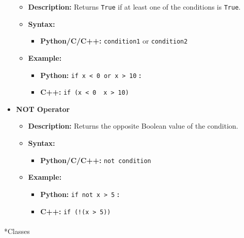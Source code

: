 \documentclass[
  letterpaper,
  DIV=11,
  numbers=noendperiod]{scrreprt}
\makeatletter
\let\oldparagraph\paragraph
\renewcommand{\paragraph}{
    \@ifstar
      \xxxParagraphStar
      \xxxParagraphNoStar
  }
\newcommand{\xxxParagraphStar}[1]{\oldparagraph*{#1}\mbox{}}
\newcommand{\xxxParagraphNoStar}[1]{\oldparagraph{#1}\mbox{}}
\providecommand{\tightlist}{%
  \setlength{\itemsep}{0pt}\setlength{\parskip}{0pt}}
\makeatother
\begin{document}
\begin{tcolorbox}[enhanced jigsaw, colframe=quarto-callout-note-color-frame, toprule=.15mm, bottomrule=.15mm, rightrule=.15mm, colback=white, breakable, arc=.35mm, opacityback=0, left=2mm, leftrule=.75mm]
\begin{itemize}
  \begin{itemize}
  \item
    \textbf{Description:} Returns \texttt{True} if at least one of the
    conditions is \texttt{True}.
  \item
    \textbf{Syntax:}

    \begin{itemize}
    \tightlist
    \item
      \textbf{Python/C/C++:} \texttt{condition1} or \texttt{condition2}
    \end{itemize}
  \item
    \textbf{Example:}

    \begin{itemize}
    \tightlist
    \item
      \textbf{Python:}
      \texttt{if\ x\ \textless{}\ 0\ or\ x\ \textgreater{}\ 10}
      \textbf{:}
    \item
      \textbf{C++:}
      \texttt{if\ (x\ \textless{}\ 0\ \textbar{}\textbar{}\ x\ \textgreater{}\ 10)}
    \end{itemize}
  \end{itemize}
\item
  \textbf{NOT Operator}

  \begin{itemize}
  \item
    \textbf{Description:} Returns the opposite Boolean value of the
    condition.
  \item
    \textbf{Syntax:}

    \begin{itemize}
    \tightlist
    \item
      \textbf{Python/C/C++:} \texttt{not\ condition}
    \end{itemize}
  \item
    \textbf{Example:}

    \begin{itemize}
    \tightlist
    \item
      \textbf{Python:} \texttt{if\ not\ x\ \textgreater{}\ 5} \textbf{:}
    \item
      \textbf{C++:} \texttt{if\ (!(x\ \textgreater{}\ 5))}
    \end{itemize}
  \end{itemize}
\end{itemize}

\end{tcolorbox}

\paragraph*{Classes}\label{classes}
\end{document}
